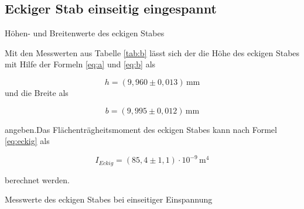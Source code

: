 \subsection{Eckiger Stab einseitig eingespannt}

\begin{table}[H]
  \centering
  
  
  \caption{Höhen- und Breitenwerte des eckigen Stabes}
  \label{tab:c}
\end{table}

Mit den Messwerten aus Tabelle \ref{tab:b} lässt sich
der die Höhe des eckigen Stabes mit Hilfe der Formeln
\ref{eq:a} und \ref{eq:b} als 

\begin{equation*}
  h=(9,960 \pm 0,013)\,\si{\milli\meter}
\end{equation*}
\noindent und die Breite als

\begin{equation*}
  b=(9,995 \pm 0,012)\,\si{\milli\meter}
\end{equation*}

\noindent angeben.Das Flächenträgheitsmoment des eckigen Stabes kann nach Formel  \ref{eq:eckig}
als

\begin{equation*}
  I_{Eckig}=(85,4 \pm 1,1)\cdot 10^{-9}\,\si{\meter \tothe{4}}
\end{equation*}

\noindent berechnet werden. 

\begin{table}[H]
  \centering
  
  
  \caption{Messwerte des eckigen Stabes bei einseitiger Einspannung}
  \label{tab:d}
\end{table}


